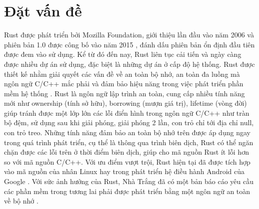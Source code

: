 \chapter{Đặt vấn đề}
\label{chap:introduction}

Rust được phát triển bởi Mozilla Foundation, giới thiệu lần đầu vào năm 2006 và phiên bản 1.0 được công bố vào năm 2015 \cite{seidel2024bringing}, đánh dấu phiên bản ổn định đầu tiên được đem vào sử dụng.
Kể từ đó đến nay, Rust liên tục cải tiến và ngày càng được nhiều dự án sử dụng, đặc biệt là những dự án ở cấp độ hệ thống.
Rust được thiết kế nhằm giải quyết các vấn đề về an toàn bộ nhớ, an toàn đa luồng mà ngôn ngữ C/C++ mắc phải và đảm bảo hiệu năng trong việc phát triển phần mềm hệ thống \cite{je2020scientists, stackoverflowStackOverflow}.
Rust là ngôn ngữ lập trình an toàn, cung cấp nhiều tính năng mới như ownership (tính sở hữu), borrowing (mượn giá trị), lifetime (vòng đời) giúp tránh được một lớp lớn các lỗi điển hình trong ngôn ngữ C/C++ như tràn bộ đệm, sử dụng sau khi giải phóng, giải phóng 2 lần, con trỏ chỉ tới địa chỉ null, con trỏ treo.
Những tính năng đảm bảo an toàn bộ nhớ trên được áp dụng ngay trong quá trình phát triển, cụ thể là thông qua trình biên dịch, Rust có thể ngăn chặn được các lỗi trên ở thời điểm biên dịch, giúp cho mã nguồn Rust ít lỗi hơn so với mã nguồn C/C++.
Với ưu điểm vượt trội, Rust hiện tại đã được tích hợp vào mã nguồn của nhân Linux \cite{kernelRustx2014} hay trong phát triển hệ điều hành Android của Google \cite{androidAndroidRust, googleblogMemorySafe}.
Với sức ảnh hưởng của Rust, Nhà Trắng đã có một bản báo cáo yêu cầu các phần mềm trong tương lai phải được phát triển bằng một ngôn ngữ an toàn về bộ nhớ \cite{whitehousePressRelease}.


